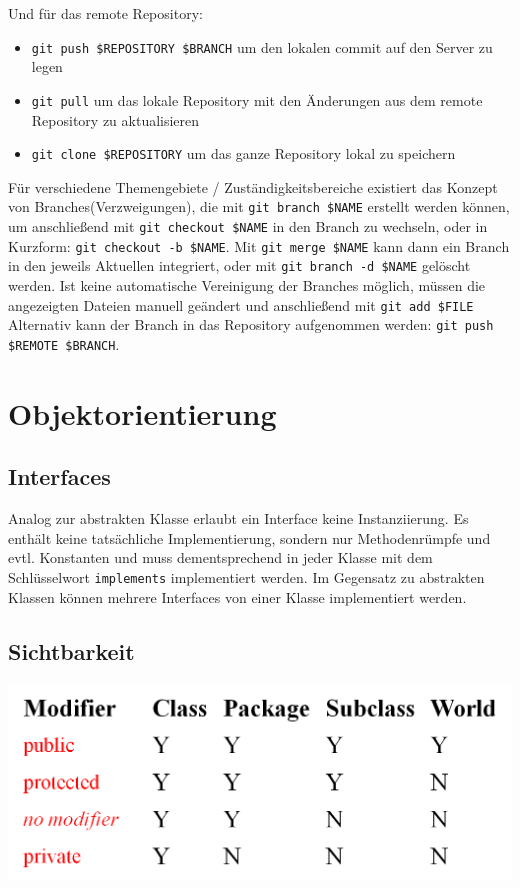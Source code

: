 \documentclass[12pt,a4]{article}
\begin{document}
	Und für das remote Repository:
	\begin{itemize}
		\item \texttt{git push \$REPOSITORY \$BRANCH} um den lokalen commit auf den Server zu legen
		\item \texttt{git pull} um das lokale Repository mit den Änderungen aus dem remote Repository zu aktualisieren
		\item \texttt{git clone \$REPOSITORY} um das ganze Repository lokal zu speichern
	\end{itemize}


	
	Für verschiedene Themengebiete / Zuständigkeitsbereiche existiert das Konzept von Branches(Verzweigungen), die mit \texttt{git branch \$NAME} erstellt werden können, um anschließend mit \texttt{git checkout \$NAME} in den Branch zu wechseln, oder in Kurzform: \texttt{git checkout -b \$NAME}. Mit \texttt{git merge \$NAME} kann dann ein Branch in den jeweils Aktuellen integriert, oder mit \texttt{git branch -d \$NAME} gelöscht werden. Ist keine automatische Vereinigung der Branches möglich, müssen die angezeigten Dateien manuell geändert und anschließend mit \texttt{git add \$FILE} Alternativ kann der Branch in das Repository aufgenommen werden: \texttt{git push \$REMOTE \$BRANCH}.
	
	
	


	\section{Objektorientierung}
	\subsection{Interfaces}
	Analog zur abstrakten Klasse erlaubt ein Interface keine Instanziierung. Es enthält keine tatsächliche Implementierung, sondern nur Methodenrümpfe und evtl. Konstanten und muss dementsprechend in jeder Klasse mit dem Schlüsselwort \texttt{implements} implementiert werden. Im Gegensatz zu abstrakten Klassen können mehrere Interfaces von einer Klasse implementiert werden.
	
	\subsection{Sichtbarkeit}
	
	\begin{center}
		\includegraphics[width=0.7\linewidth]{images/modifiers}
	\end{center}
	
\end{document}
